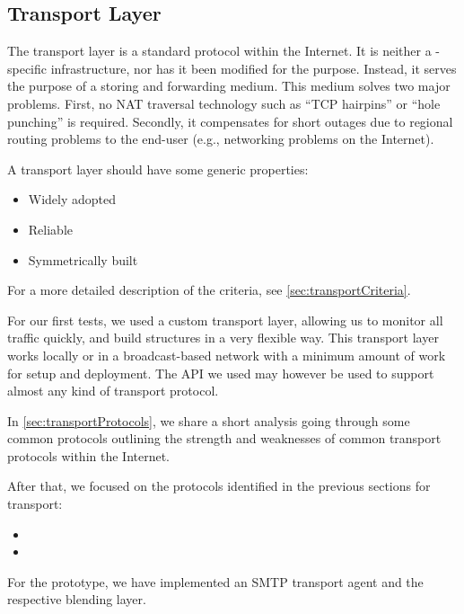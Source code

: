 \subsection{Transport Layer}
The transport layer is a standard protocol within the Internet. It is neither a \MessageVortex{}-specific infrastructure, nor has it been modified for the purpose. Instead, it serves the purpose of a storing and forwarding medium. This medium solves two major problems. First, no NAT traversal technology such as ``TCP hairpins'' or ``hole punching'' is required. Secondly, it compensates for short outages due to regional routing problems to the end-user (e.g., networking problems on the Internet).

A transport layer should have some generic properties:
\begin{itemize}
	\item Widely adopted 
	\item Reliable
	\item Symmetrically built 
\end{itemize}

For a more detailed description of the criteria, see \cref{sec:transportCriteria}.

For our first tests, we used a custom transport layer, allowing us to monitor all traffic quickly, and build structures in a very flexible way. This transport layer works locally or in a broadcast-based network with a minimum amount of work for setup and deployment. The API we used may however be used to support almost any kind of transport protocol.

In \cref{sec:transportProtocols}, we share a short analysis going through some common protocols outlining the strength and weaknesses of common transport protocols within the Internet.

After that, we focused on the protocols identified in the previous sections for transport:
\begin{itemize}
	\item {}
	\item {}
\end{itemize}

For the prototype, we have implemented an SMTP transport agent and the respective blending layer.

